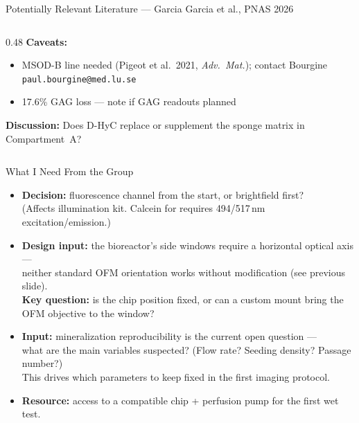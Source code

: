 \documentclass[aspectratio=169,11pt]{beamer}
\begin{document}
\begin{frame}[shrink=5]{Potentially Relevant Literature --- Garcia Garcia et al., PNAS 2026}
\begin{columns}[T]
\begin{column}{0.48\textwidth}
      \vspace{0.2em}
      \footnotesize\textbf{Caveats:}\vspace{0.1em}
      \begin{itemize}\itemsep=0pt
        \item MSOD-B line needed (Pigeot et al.\ 2021, \textit{Adv.\ Mat.}); contact Bourgine \texttt{paul.bourgine@med.lu.se}
        \item 17.6\% GAG loss --- note if GAG readouts planned
      \end{itemize}

      \vspace{0.25em}
      \footnotesize\alert{\textbf{Discussion:}} Does D-HyC replace or supplement the sponge matrix in Compartment~A?
    \end{column}
  \end{columns}

\end{frame}

\begin{frame}{What I Need From the Group}

  \small
  \begin{itemize}\itemsep=0.4em
    \item \textbf{Decision:} fluorescence channel from the start, or brightfield first?\\
          \footnotesize (Affects illumination kit. Calcein for  requires 494/517\,nm excitation/emission.)
    \item \textbf{Design input:} the bioreactor's side windows require a horizontal optical axis ---\\
          \footnotesize neither standard OFM orientation works without modification (see previous slide).\\
          \footnotesize \textbf{Key question:} is the chip position fixed, or can a custom mount bring the OFM objective to the window?
    \item \textbf{Input:} mineralization reproducibility is the current open question ---\\
          \footnotesize what are the main variables suspected? (Flow rate? Seeding density? Passage number?)\\
          \footnotesize This drives which parameters to keep fixed in the first imaging protocol.
    \item \textbf{Resource:} access to a compatible chip + perfusion pump for the first wet test.
  \end{itemize}

\end{frame}
\end{document}
